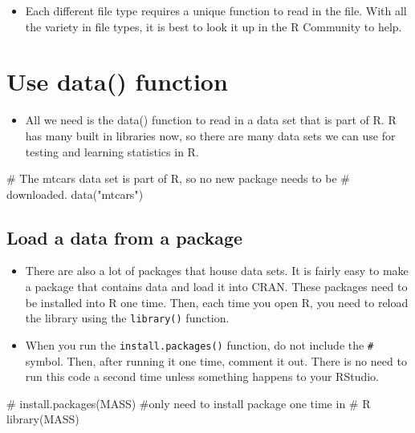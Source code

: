 \documentclass[
  letterpaper,
  DIV=11,
  numbers=noendperiod]{scrreprt}
\newenvironment{Shaded}{\begin{snugshade}}{\end{snugshade}}
\newcommand{\CommentTok}[1]{\textcolor[rgb]{0.37,0.37,0.37}{#1}}
\newcommand{\FunctionTok}[1]{\textcolor[rgb]{0.28,0.35,0.67}{#1}}
\newcommand{\NormalTok}[1]{\textcolor[rgb]{0.00,0.23,0.31}{#1}}
\newcommand{\StringTok}[1]{\textcolor[rgb]{0.13,0.47,0.30}{#1}}
\providecommand{\tightlist}{%
  \setlength{\itemsep}{0pt}\setlength{\parskip}{0pt}}\usepackage{longtable,booktabs,array}
\begin{document}
\begin{itemize}
\tightlist
\item
  Each different file type requires a unique function to read in the
  file. With all the variety in file types, it is best to look it up in
  the R Community to help.
\end{itemize}

\section{Use data() function}\label{use-data-function}

\begin{itemize}
\tightlist
\item
  All we need is the data() function to read in a data set that is part
  of R. R has many built in libraries now, so there are many data sets
  we can use for testing and learning statistics in R.
\end{itemize}

\begin{Shaded}
\begin{Highlighting}[]
\CommentTok{\# The mtcars data set is part of R, so no new package needs to be}
\CommentTok{\# downloaded.}
\FunctionTok{data}\NormalTok{(}\StringTok{"mtcars"}\NormalTok{)}
\end{Highlighting}
\end{Shaded}

\subsection{Load a data from a
package}\label{load-a-data-from-a-package}

\begin{itemize}
\tightlist
\item
  There are also a lot of packages that house data sets. It is fairly
  easy to make a package that contains data and load it into CRAN. These
  packages need to be installed into R one time. Then, each time you
  open R, you need to reload the library using the \texttt{library()}
  function.
\item
  When you run the \texttt{install.packages()} function, do not include
  the \texttt{\#} symbol. Then, after running it one time, comment it
  out. There is no need to run this code a second time unless something
  happens to your RStudio.
\end{itemize}

\begin{Shaded}
\begin{Highlighting}[]
\CommentTok{\# install.packages(\textquotesingle{}MASS\textquotesingle{}) \#only need to install package one time in}
\CommentTok{\# R}
\FunctionTok{library}\NormalTok{(MASS)}
\end{Highlighting}
\end{Shaded}
\end{document}
